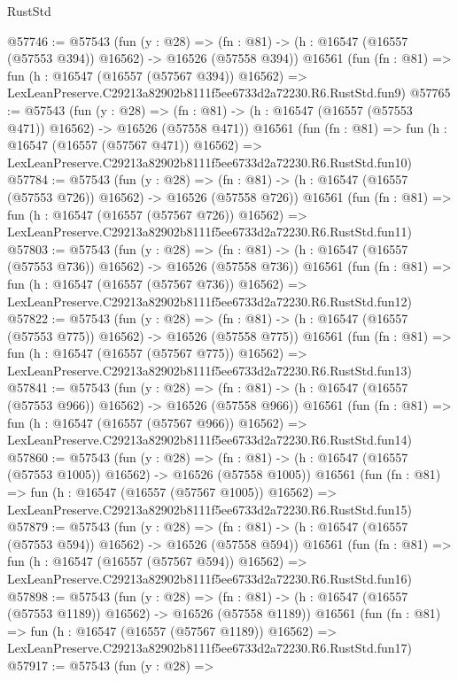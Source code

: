 \begin{lexlean}{RustStd}
\begin{coremodule}
@57746 := @57543
    (fun (y : @28) =>
    (fn : @81) -> (h : @16547 (@16557 (@57553 @394)) @16562) -> @16526 (@57558 @394))
    @16561
    (fun (fn : @81) =>
    fun (h : @16547 (@16557 (@57567 @394)) @16562) =>
    LexLeanPreserve.C29213a82902b8111f5ee6733d2a72230.R6.RustStd.fun9)
@57765 := @57543
    (fun (y : @28) =>
    (fn : @81) -> (h : @16547 (@16557 (@57553 @471)) @16562) -> @16526 (@57558 @471))
    @16561
    (fun (fn : @81) =>
    fun (h : @16547 (@16557 (@57567 @471)) @16562) =>
    LexLeanPreserve.C29213a82902b8111f5ee6733d2a72230.R6.RustStd.fun10)
@57784 := @57543
    (fun (y : @28) =>
    (fn : @81) -> (h : @16547 (@16557 (@57553 @726)) @16562) -> @16526 (@57558 @726))
    @16561
    (fun (fn : @81) =>
    fun (h : @16547 (@16557 (@57567 @726)) @16562) =>
    LexLeanPreserve.C29213a82902b8111f5ee6733d2a72230.R6.RustStd.fun11)
@57803 := @57543
    (fun (y : @28) =>
    (fn : @81) -> (h : @16547 (@16557 (@57553 @736)) @16562) -> @16526 (@57558 @736))
    @16561
    (fun (fn : @81) =>
    fun (h : @16547 (@16557 (@57567 @736)) @16562) =>
    LexLeanPreserve.C29213a82902b8111f5ee6733d2a72230.R6.RustStd.fun12)
@57822 := @57543
    (fun (y : @28) =>
    (fn : @81) -> (h : @16547 (@16557 (@57553 @775)) @16562) -> @16526 (@57558 @775))
    @16561
    (fun (fn : @81) =>
    fun (h : @16547 (@16557 (@57567 @775)) @16562) =>
    LexLeanPreserve.C29213a82902b8111f5ee6733d2a72230.R6.RustStd.fun13)
@57841 := @57543
    (fun (y : @28) =>
    (fn : @81) -> (h : @16547 (@16557 (@57553 @966)) @16562) -> @16526 (@57558 @966))
    @16561
    (fun (fn : @81) =>
    fun (h : @16547 (@16557 (@57567 @966)) @16562) =>
    LexLeanPreserve.C29213a82902b8111f5ee6733d2a72230.R6.RustStd.fun14)
@57860 := @57543
    (fun (y : @28) =>
    (fn : @81) -> (h : @16547 (@16557 (@57553 @1005)) @16562) -> @16526 (@57558 @1005))
    @16561
    (fun (fn : @81) =>
    fun (h : @16547 (@16557 (@57567 @1005)) @16562) =>
    LexLeanPreserve.C29213a82902b8111f5ee6733d2a72230.R6.RustStd.fun15)
@57879 := @57543
    (fun (y : @28) =>
    (fn : @81) -> (h : @16547 (@16557 (@57553 @594)) @16562) -> @16526 (@57558 @594))
    @16561
    (fun (fn : @81) =>
    fun (h : @16547 (@16557 (@57567 @594)) @16562) =>
    LexLeanPreserve.C29213a82902b8111f5ee6733d2a72230.R6.RustStd.fun16)
@57898 := @57543
    (fun (y : @28) =>
    (fn : @81) -> (h : @16547 (@16557 (@57553 @1189)) @16562) -> @16526 (@57558 @1189))
    @16561
    (fun (fn : @81) =>
    fun (h : @16547 (@16557 (@57567 @1189)) @16562) =>
    LexLeanPreserve.C29213a82902b8111f5ee6733d2a72230.R6.RustStd.fun17)
@57917 := @57543
    (fun (y : @28) =>

\end{coremodule}
\end{lexlean}
